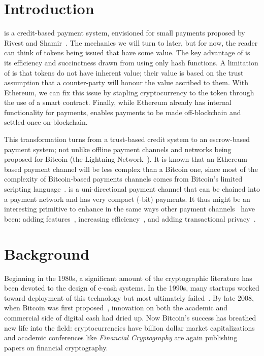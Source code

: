

\section{Introduction} 

\pw is a credit-based payment system, envisioned for small payments proposed by Rivest and Shamir~\cite{RS96}. The mechanics we will turn to later, but for now, the reader can think of tokens being issued that have some value. The key advantage of \pw is its efficiency and succinctness drawn from using only hash functions. A limitation of \pw is that tokens do not have inherent value; their value is based on the trust assumption that a counter-party will honour the value ascribed to them. With Ethereum, we can fix this issue by stapling cryptocurrency to the token through the use of a smart contract. Finally, while Ethereum already has internal functionality for payments, \ew enables payments to be made off-blockchain and settled once on-blockchain.

This transformation turns \pw from a trust-based credit system to an escrow-based payment system; not unlike offline payment channels and networks being proposed for Bitcoin (\eg the Lightning Network~\cite{PD15}). It is known that an Ethereum-based payment channel will be less complex than a Bitcoin one, since most of the complexity of Bitcoin-based payments channels comes from Bitcoin's limited scripting language~\cite{MMSH16}. \ew is a uni-directional payment channel that can be chained into a payment network and has very compact (-bit) payments. It thus might be an interesting primitive to enhance in the same ways other payment channels~\cite{DW15,PD15} have been: adding features~\cite{KG17}, increasing efficiency~\cite{DEFM17,MBKM17}, and adding transactional privacy~\cite{GM17,MMK+17,HAB+17,RMKG18}.

\section{Background}

Beginning in the 1980s, a significant amount of the cryptographic literature has been devoted to the design of e-cash systems. In the 1990s, many startups worked toward deployment of this technology but most ultimately failed~\cite{NBFMG16}. By late 2008, when Bitcoin was first proposed~\cite{Nak08}, innovation on both the academic and commercial side of digital cash had dried up. Now Bitcoin's success has breathed new life into the field: cryptocurrencies have billion dollar market capitalizations and academic conferences like \textit{Financial Cryptography} are again publishing papers on financial cryptography. 

